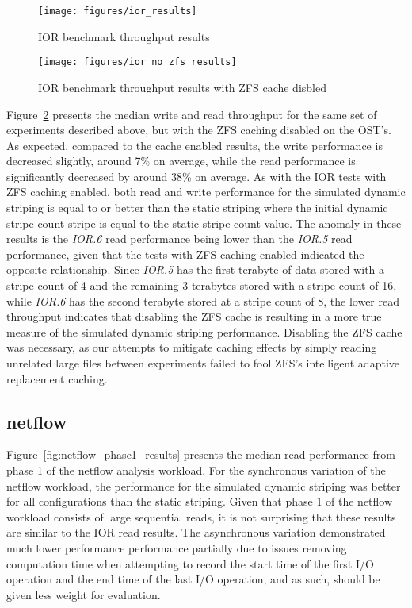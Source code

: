 \documentclass[conference,compsoc]{IEEEtran}
\begin{document}
\begin{figure}[t]
\centering
  \texttt{[image: figures/ior\_results]}
\caption{IOR benchmark throughput results}
\label{fig:ior_results}
\end{figure}

\begin{figure}[t]
\centering
  \texttt{[image: figures/ior\_no\_zfs\_results]}
\caption{IOR benchmark throughput results with ZFS cache disbled}
\label{fig:ior_no_zfs_results}
\end{figure}

Figure~\ref{fig:ior_no_zfs_results} presents the median write and read throughput for the same set of experiments described above, but with the ZFS caching disabled on the OST's. As expected, compared to the cache enabled results, the write performance is decreased slightly, around 7\% on average, while the read performance is significantly decreased by around 38\% on average. As with the IOR tests with ZFS caching enabled, both read and write performance for the simulated dynamic striping is equal to or better than the static striping where the initial dynamic stripe count stripe is equal to the static stripe count value. The anomaly in these results is the \emph{IOR.6} read performance being lower than the \emph{IOR.5} read performance, given that the tests with ZFS caching enabled indicated the opposite relationship. Since \emph{IOR.5} has the first terabyte of data stored with a stripe count of 4 and the remaining 3 terabytes stored with a stripe count of 16, while \emph{IOR.6} has the second terabyte stored at a stripe count of 8, the lower read throughput indicates that disabling the ZFS cache is resulting in a more true measure of the simulated dynamic striping performance. Disabling the ZFS cache was necessary, as our attempts to mitigate caching effects by simply reading unrelated large files between experiments failed to fool ZFS's intelligent adaptive replacement caching.


\subsection{netflow}

Figure~\ref{fig:netflow_phase1_results} presents the median read performance from phase 1 of the netflow analysis workload. For the synchronous variation of the netflow workload, the performance for the simulated dynamic striping was better for all configurations than the static striping. Given that phase 1 of the netflow workload consists of large sequential reads, it is not surprising that these results are similar to the IOR read results. The asynchronous variation demonstrated much lower performance performance partially due to issues removing computation time when attempting to record the start time of the first I/O operation and the end time of the last I/O operation, and as such, should be given less weight for evaluation. 
\end{document}
